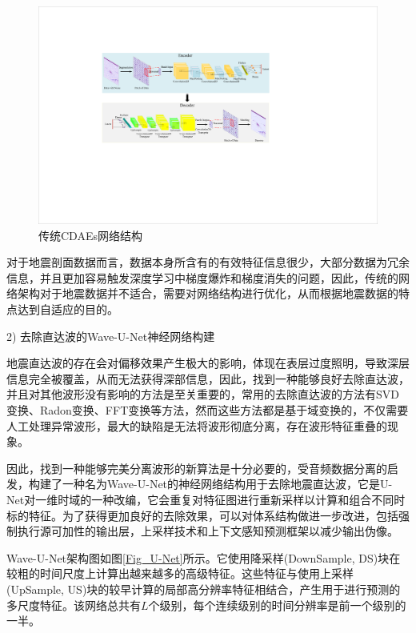 \documentclass[11pt]{article}
\begin{document}
\par
\begin{figure}[htbp]
\centering
\includegraphics[width=5.5in]{./FigureFolder/CDAEs/StructureOfCDAEs.pdf}
\caption{传统CDAEs网络结构}
\label{Fig_CDAEs}
\end{figure}
\par
对于地震剖面数据而言，数据本身所含有的有效特征信息很少，大部分数据为冗余信息，并且更加容易触发深度学习中梯度爆炸和梯度消失的问题，因此，传统的网络架构对于地震数据并不适合，需要对网络结构进行优化，从而根据地震数据的特点达到自适应的目的。
\par
2) 去除直达波的Wave-U-Net神经网络构建
\par
地震直达波的存在会对偏移效果产生极大的影响，体现在表层过度照明，导致深层信息完全被覆盖，从而无法获得深部信息，因此，找到一种能够良好去除直达波，并且对其他波形没有影响的方法是至关重要的，常用的去除直达波的方法有SVD变换、Radon变换、FFT变换等方法，然而这些方法都是基于域变换的，不仅需要人工处理异常波形，最大的缺陷是无法将波形彻底分离，存在波形特征重叠的现象。
\par
因此，找到一种能够完美分离波形的新算法是十分必要的，受音频数据分离的启发，构建了一种名为Wave-U-Net的神经网络结构用于去除地震直达波，它是U-Net对一维时域的一种改编，它会重复对特征图进行重新采样以计算和组合不同时标的特征。为了获得更加良好的去除效果，可以对体系结构做进一步改进，包括强制执行源可加性的输出层，上采样技术和上下文感知预测框架以减少输出伪像。
\par
Wave-U-Net架构图如图\ref{Fig_U-Net}所示。它使用降采样(DownSample, DS)块在较粗的时间尺度上计算出越来越多的高级特征。这些特征与使用上采样(UpSample, US)块的较早计算的局部高分辨率特征相结合，产生用于进行预测的多尺度特征。该网络总共有$L$个级别，每个连续级别的时间分辨率是前一个级别的一半。
\par
\end{document}
